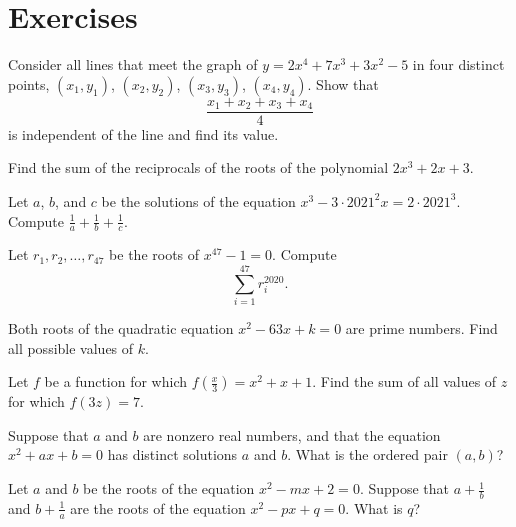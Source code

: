 \documentclass[11pt]{scrartcl}
\begin{document}
\section{Exercises}

\begin{exercise}[Putnam 1977]
	Consider all lines that meet the graph of $y = 2x^4 + 7x^3 + 3x^2 - 5$ in four distinct points, $(x_1, y_1)$, $(x_2, y_2)$, $(x_3, y_3)$, $(x_4, y_4)$. Show that
	\[\frac{x_1 + x_2 + x_3 + x_4}{4}\]
	is independent of the line and find its value.
\end{exercise}

\begin{exercise}
	Find the sum of the reciprocals of the roots of the polynomial $2x^3 + 2x + 3$.
\end{exercise}

\begin{exercise}
    Let $a$, $b$, and $c$ be the solutions of the equation $x^3 - 3 \cdot 2021^2x = 2 \cdot 2021^3$. Compute $\frac 1a + \frac 1b + \frac 1c$.
\end{exercise}

\begin{exercise}
    Let $r_1,r_2,\dots,r_{47}$ be the roots of $x^{47} - 1 = 0$. Compute
    \[\sum_{i = 1}^{47}r_i^{2020}.\]
\end{exercise}

\begin{exercise}[AMC 12A 2002/12]
    Both roots of the quadratic equation $x^2-63x+k=0$ are prime numbers. Find all possible values of $k$.
\end{exercise}

\begin{exercise}[AMC 10 2000/24]
    Let $f$ be a function for which $f(\frac x3)=x^2+x+1$. Find the sum of all values of $z$ for which $f(3z)=7$.
\end{exercise}

\begin{exercise}[AMC 12B 2002/6]
    Suppose that $a$ and $b$ are nonzero real numbers, and that the equation $x^2+ax+b=0$ has distinct solutions $a$ and $b$. What is the ordered pair $(a,b)$? 
\end{exercise}

\begin{exercise}[AMC 10B 2006/14]
     Let $a$ and $b$ be the roots of the equation $x^2 - mx + 2=0$. Suppose that $a + \frac 1b$ and $b + \frac 1a$ are the roots of the equation $x^2-px+q=0$. What is $q$?
\end{exercise}
\end{document}
